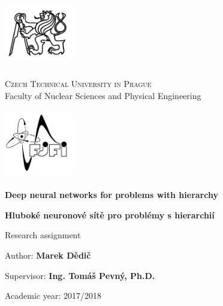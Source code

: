 \begin{center}
	\begin{minipage}{3cm}
		\includegraphics[width=3cm,height=3cm,keepaspectratio]{images/titlepage/cvut}
	\end{minipage}
	\begin{minipage}{0.6\linewidth}
		\begin{center}
			\textsc{\large Czech Technical University in Prague}\\
			{\large Faculty of Nuclear Sciences and Physical Engineering}
		\end{center}
	\end{minipage}
	\begin{minipage}{3cm}
		\includegraphics[width=3cm,height=3cm,keepaspectratio]{images/titlepage/fjfi}
	\end{minipage}

	\vspace{3.3cm}

	\textbf{\huge Deep neural networks for problems with hierarchy}
	\vspace{1.1cm}

	\textenglish{\textbf{\huge Hluboké neuronové sítě pro problémy s hierarchií}}
	\vspace{1.7cm}

	{\large Research assignment}
\end{center}

\vfill

\begin{list}{}{
	\settowidth{\labelwidth}{MMMMMMMMM}
	\setlength{\leftmargin}{\labelwidth}
	\renewcommand{\makelabel}[1]{#1\hfil}}
	\item [{Author:}] \textbf{Marek Dědič}
	\item [{Supervisor:}] \textbf{Ing. Tomáš Pevný, Ph.D.}
	\item [{Academic year:}] 2017/2018
\end{list}
